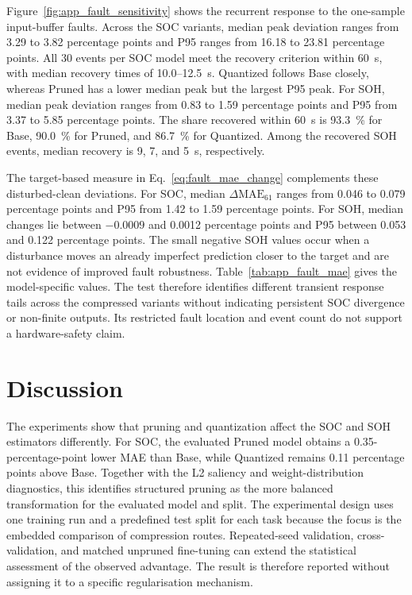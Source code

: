 \documentclass[review]{elsarticle}
\begin{document}
Figure~\ref{fig:app_fault_sensitivity} shows the recurrent response to the one-sample input-buffer faults. Across the SOC variants, median peak deviation ranges from 3.29 to 3.82 percentage points and P95 ranges from 16.18 to 23.81 percentage points. All 30 events per SOC model meet the recovery criterion within 60~s, with median recovery times of 10.0--12.5~s. Quantized follows Base closely, whereas Pruned has a lower median peak but the largest P95 peak. For SOH, median peak deviation ranges from 0.83 to 1.59 percentage points and P95 from 3.37 to 5.85 percentage points. The share recovered within 60~s is 93.3~\% for Base, 90.0~\% for Pruned, and 86.7~\% for Quantized. Among the recovered SOH events, median recovery is 9, 7, and 5~s, respectively.

The target-based measure in Eq.~\ref{eq:fault_mae_change} complements these disturbed-clean deviations. For SOC, median $\Delta\mathrm{MAE}_{61}$ ranges from 0.046 to 0.079 percentage points and P95 from 1.42 to 1.59 percentage points. For SOH, median changes lie between $-0.0009$ and 0.0012 percentage points and P95 between 0.053 and 0.122 percentage points. The small negative SOH values occur when a disturbance moves an already imperfect prediction closer to the target and are not evidence of improved fault robustness. Table~\ref{tab:app_fault_mae} gives the model-specific values. The test therefore identifies different transient response tails across the compressed variants without indicating persistent SOC divergence or non-finite outputs. Its restricted fault location and event count do not support a hardware-safety claim.

\section{Discussion}
The experiments show that pruning and quantization affect the SOC and SOH estimators differently. For SOC, the evaluated Pruned model obtains a 0.35-percentage-point lower MAE than Base, while Quantized remains 0.11 percentage points above Base. Together with the L2 saliency and weight-distribution diagnostics, this identifies structured pruning as the more balanced transformation for the evaluated model and split. The experimental design uses one training run and a predefined test split for each task because the focus is the embedded comparison of compression routes. Repeated-seed validation, cross-validation, and matched unpruned fine-tuning can extend the statistical assessment of the observed advantage. The result is therefore reported without assigning it to a specific regularisation mechanism.
\end{document}
